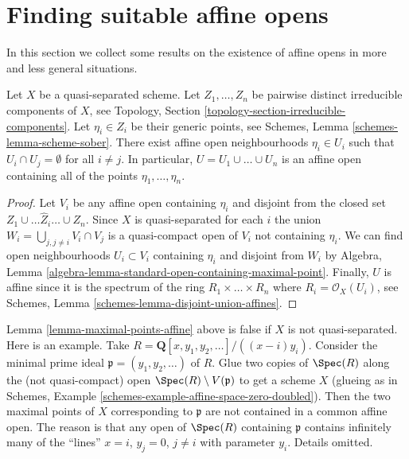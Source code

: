 \section{Finding suitable affine opens}
\label{section-finding-affine-opens}

\noindent
In this section we collect some results on the existence of
affine opens in more and less general situations.

\begin{lemma}
\label{lemma-maximal-points-affine}
Let $X$ be a quasi-separated scheme.
Let $Z_1, \ldots, Z_n$ be pairwise distinct irreducible components of $X$,
see Topology, Section \ref{topology-section-irreducible-components}.
Let $\eta_i \in Z_i$ be their generic points, see
Schemes, Lemma \ref{schemes-lemma-scheme-sober}.
There exist affine open neighbourhoods $\eta_i \in U_i$
such that $U_i \cap U_j = \emptyset$ for all $i \not = j$.
In particular, $U = U_1 \cup \ldots \cup U_n$ is an affine
open containing all of the points $\eta_1, \ldots, \eta_n$.
\end{lemma}

\begin{proof}
Let $V_i$ be any affine open containing $\eta_i$
and disjoint from the closed set $Z_1 \cup \ldots \hat Z_i \ldots \cup Z_n$.
Since $X$ is quasi-separated for each $i$ the union
$W_i = \bigcup_{j, j \not = i} V_i \cap V_j$ is a quasi-compact
open of $V_i$ not containing $\eta_i$.
We can find open neighbourhoods $U_i \subset V_i$
containing $\eta_i$ and disjoint from $W_i$ by
Algebra, Lemma \ref{algebra-lemma-standard-open-containing-maximal-point}.
Finally, $U$ is affine since it is the spectrum of
the ring $R_1 \times \ldots \times R_n$ where $R_i = \mathcal{O}_X(U_i)$,
see Schemes, Lemma \ref{schemes-lemma-disjoint-union-affines}.
\end{proof}

\begin{remark}
\label{remark-maximal-points-affine}
Lemma \ref{lemma-maximal-points-affine} above is false if $X$
is not quasi-separated. Here is an example. Take
$R = \mathbf{Q}[x, y_1, y_2, \ldots]/((x-i)y_i)$.
Consider the minimal prime ideal $\mathfrak p = (y_1, y_2, \ldots)$
of $R$. Glue two copies of $\Spec(R)$ along the
(not quasi-compact) open $\Spec(R) \setminus V(\mathfrak p)$
to get a scheme $X$ (glueing as in
Schemes, Example \ref{schemes-example-affine-space-zero-doubled}).
Then the two maximal points of $X$ corresponding to $\mathfrak p$
are not contained in a common affine open. The reason is
that any open of $\Spec(R)$ containing $\mathfrak p$
contains infinitely many of the ``lines'' $x = i$, $y_j = 0$,
$j \not = i$ with parameter $y_i$. Details omitted.
\end{remark}

